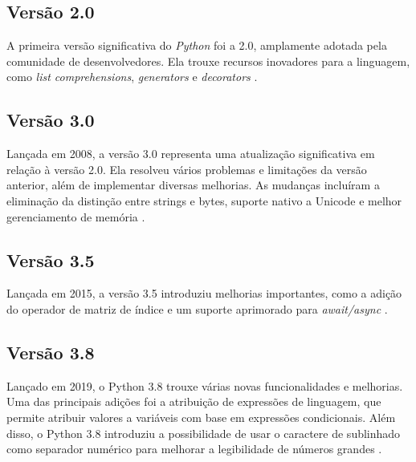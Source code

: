 \subsection{Versão 2.0}
A primeira versão significativa do \textit{Python} foi a 2.0, amplamente adotada pela comunidade de desenvolvedores. Ela trouxe recursos inovadores para a linguagem, como \textit{list comprehensions}, \textit{generators} e \textit{decorators} \cite{awari_python_version}.

\subsection{Versão 3.0}
Lançada em 2008, a versão 3.0 representa uma atualização significativa em relação à versão 2.0. Ela resolveu vários problemas e limitações da versão anterior, além de implementar diversas melhorias. As mudanças incluíram a eliminação da distinção entre strings e bytes, suporte nativo a Unicode e melhor gerenciamento de memória \cite{awari_python_version}.

\subsection{Versão 3.5}
Lançada em 2015, a versão 3.5 introduziu melhorias importantes, como a adição do operador de matriz de índice e um suporte aprimorado para \textit{await/async} \cite{awari_python_version}.

\subsection{Versão 3.8}
Lançado em 2019, o Python 3.8 trouxe várias novas funcionalidades e melhorias. Uma das principais adições foi a atribuição de expressões de linguagem, que permite atribuir valores a variáveis com base em expressões condicionais. Além disso, o Python 3.8 introduziu a possibilidade de usar o caractere de sublinhado como separador numérico para melhorar a legibilidade de números grandes \cite{awari_python_version}.